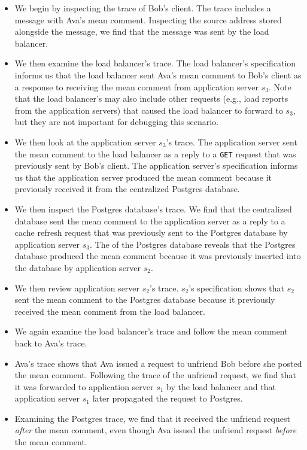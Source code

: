 \begin{itemize}
  \item
    We begin by inspecting the trace of Bob's \systemname{} client. The trace
    includes a message with Ava's mean comment. Inspecting the source address
    stored alongside the message, we find that the message was sent by the load
    balancer.
  \item
    We then examine the load balancer's trace. The load balancer's
    \watprovenance{} specification informs us that the load balancer sent Ava's
    mean comment to Bob's \systemname{} client as a response to receiving the
    mean comment from application server $s_3$. Note that the load balancer's
    \watprovenance{} may also include other requests (e.g., load reports from
    the application servers) that caused the load balancer to forward to $s_3$,
    but they are not important for debugging this scenario.
  \item
    We then look at the application server $s_3$'s trace. The application
    server sent the mean comment to the load balancer as a reply to a
    \texttt{GET} request that was previously sent by Bob's \systemname{}
    client. The application server's \watprovenance{} specification informs us
    that the application server produced the mean comment because it previously
    received it from the centralized Postgres database.
  \item
    We then inspect the Postgres database's trace. We find that the centralized
    database sent the mean comment to the application server as a reply to a
    cache refresh request that was previously sent to the Postgres database by
    application server $s_3$. The \watprovenance{} of the Postgres database
    reveals that the Postgres database produced the mean comment because it was
    previously inserted into the database by application server $s_2$.
  \item
    We then review application server $s_2$'s trace. $s_2$'s \watprovenance{}
    specification shows that $s_2$ sent the mean comment to the Postgres
    database because it previously received the mean comment from the load
    balancer.
  \item
    We again examine the load balancer's trace and follow the mean comment back
    to Ava's \systemname{} trace.
  \item
    Ava's trace shows that Ava issued a request to unfriend Bob before she
    posted the mean comment. Following the trace of the unfriend request, we
    find that it was forwarded to application server $s_1$ by the load
    balancer and that application server $s_1$ later propagated the request to
    Postgres.
  \item
    Examining the Postgres trace, we find that it received the unfriend request
    \emph{after} the mean comment, even though Ava issued the unfriend request
    \emph{before} the mean comment.
\end{itemize}

